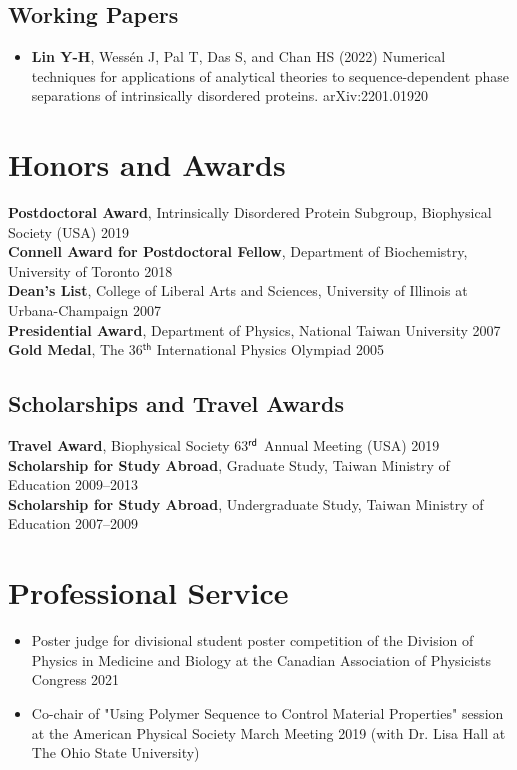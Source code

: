 \documentclass[11pt]{../yhlcv}
\def\tname#1{{\bf #1}}
\begin{document}
\subsection*{Working Papers}

\begin{itemize}[leftmargin=*]

\item
\tname{Lin Y-H}, Wessén J, Pal T, Das S, and Chan HS (2022)
Numerical techniques for applications of analytical theories to sequence-dependent phase separations of intrinsically disordered proteins. arXiv:2201.01920


\end{itemize} 

\section*{Honors and Awards}

\noindent
{\bf Postdoctoral Award}, Intrinsically Disordered Protein Subgroup, Biophysical Society (USA) \hfill 2019 \\
{\bf Connell Award for Postdoctoral Fellow}, Department of Biochemistry, University of Toronto \hfill 2018 \\
{\bf Dean's List}, College of Liberal Arts and Sciences, University of Illinois at Urbana-Champaign \hfill 2007 \\
{\bf Presidential Award}, Department of Physics, National Taiwan University \hfill 2007 \\
{\bf Gold Medal}, The 36$^{ \mathsf{th}}$ International Physics Olympiad \hfill 2005

\subsection*{Scholarships and Travel Awards} 
{\bf Travel Award}, Biophysical Society 63$^{\sf rd}$ Annual Meeting (USA) \hfill 2019 \\
{\bf Scholarship for Study Abroad}, Graduate Study, Taiwan Ministry of Education \hfill 2009--2013 \\
{\bf Scholarship for Study Abroad}, Undergraduate Study, Taiwan Ministry of Education \hfill 2007--2009 


\section*{Professional Service}
\begin{itemize}[leftmargin=*]\itemsep-0.2em
\item Poster judge for divisional student poster competition of the Division of Physics in Medicine and Biology at the Canadian Association of Physicists Congress 2021

\item Co-chair of "Using Polymer Sequence to Control Material Properties" session at the American Physical Society March Meeting 2019 (with Dr. Lisa Hall at The Ohio State University)
\end{itemize}
\end{document}
